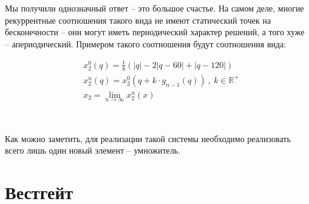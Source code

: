 \vspace{0.5in}

Мы получили однозначный ответ -- это большое счастье. На самом деле, многие рекуррентные соотношения такого вида не имеют статический точек на бесконечности -- они могут иметь периодический характер решений, а того хуже -- апериодический. Примером такого соотношения будут соотношения вида:

\begin{align*}
	&x^0_2(q) = \frac18 \left( |q| - 2|q-60| + |q-120| \right)\\
	&x^n_2(q) = x^0_2(q + k \cdot g_{n-1}(q)) \ , \ k \in \mathbb{R}^+\\
	&x_2 = \lim_{n\to\infty} x^n_2(x)
\end{align*}

\

Как можно заметить, для реализации такой системы необходимо реализовать всего лишь один новый элемент -- умножитель. 

































\vspace{1in}

\section{Вестгейт}


